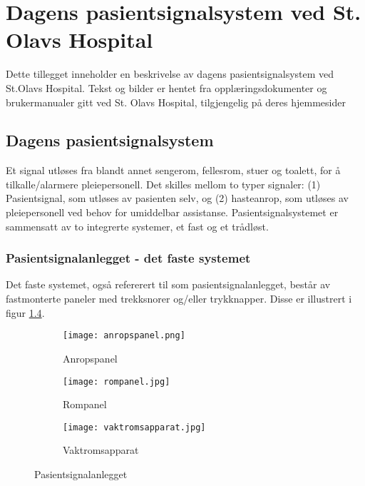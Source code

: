 \chapter{Dagens pasientsignalsystem ved St. Olavs Hospital}
\label{appendix_dagenssystem}
Dette tillegget inneholder en beskrivelse av dagens pasientsignalsystem ved St.Olavs Hospital. Tekst og bilder er hentet fra opplæringsdokumenter og brukermanualer gitt ved St. Olavs Hospital, tilgjengelig på deres hjemmesider \cite{BrukerveiledningforPasientsignal, BrukermanualforPasientsignalogPasientsignalapplikasjon, BrukerveiledningforTradlostelefon}

\section{Dagens pasientsignalsystem}
Et signal utløses fra blandt annet sengerom, fellesrom, stuer og toalett, for å tilkalle/alarmere pleiepersonell. Det skilles mellom to typer signaler: (1) Pasientsignal, som utløses av pasienten selv, og (2) hasteanrop, som utløses av pleiepersonell ved behov for umiddelbar assistanse. Pasientsignalsystemet er sammensatt av to integrerte systemer, et fast og et trådløst. 

\subsection{Pasientsignalanlegget - det faste systemet}
Det faste systemet, også refererert til som pasientsignalanlegget, består av fastmonterte paneler med trekksnorer og/eller trykknapper. Disse er illustrert i figur \ref{pasientsignalanlegget}.

\begin{figure}[H]
        \centering
        \begin{subfigure}[b]{0.3\textwidth}
        		\centering
                \texttt{[image: anropspanel.png]}
                \caption{Anropspanel}
                \label{anropspanel}
        \end{subfigure}%
        \begin{subfigure}[b]{0.3\textwidth}
        		\centering
                \texttt{[image: rompanel.jpg]}
                \caption{Rompanel}
                \label{rompanel}
        \end{subfigure}
        \begin{subfigure}[b]{0.3\textwidth}
        		\centering
                \texttt{[image: vaktromsapparat.jpg]}
                \caption{Vaktromsapparat}
                \label{vaktromsapparat}
        \end{subfigure}
        \caption{Pasientsignalanlegget}
        \label{pasientsignalanlegget}
\end{figure}

